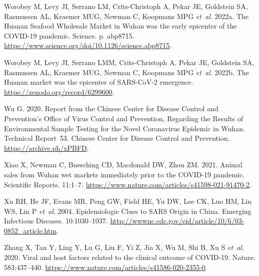 \documentclass[11pt]{article}
\begin{document}
\begin{thebibliography}{24}
{Worobey M, Levy JI, Serrano LM, {Crits-Christoph} A, Pekar JE, Goldstein SA,
  Rasmussen AL, Kraemer MUG, Newman C, Koopmans MPG {\em et~al\/}}. 2022{a}.
  The {{Huanan Seafood Wholesale Market}} in {{Wuhan}} was the early epicenter
  of the {{COVID-19}} pandemic. Science. p. abp8715.
  \url{https://www.science.org/doi/10.1126/science.abp8715}.

{Worobey M, Levy JI, Serrano LMM, {Crits-Christoph} A, Pekar JE, Goldstein SA,
  Rasmussen AL, Kraemer MUG, Newman C, Koopmans MPG {\em et~al\/}}. 2022{b}.
  The {{Huanan}} market was the epicenter of {{SARS-CoV-2}} emergence.
  \url{https://zenodo.org/record/6299600}.

{Wu G}. 2020. {Report from the Chinese Center for Disease Control and
  Prevention's Office of Virus Control and Prevention, Regarding the Results of
  Environmental Sample Testing for the Novel Coronavirus Epidemic in Wuhan}.
  Technical Report~53. Chinese Center for Disease Control and Prevention.
  \url{https://archive.ph/xPBFD}.

{Xiao X, Newman C, Buesching CD, Macdonald DW, Zhou ZM}. 2021. Animal sales
  from {{Wuhan}} wet markets immediately prior to the {{COVID-19}} pandemic.
  Scientific Reports. 11:1--7.
  \url{https://www.nature.com/articles/s41598-021-91470-2}.

{Xu RH, He JF, Evans MR, Peng GW, Field HE, Yu DW, Lee CK, Luo HM, Lin WS, Lin
  P {\em et~al\/}}. 2004. Epidemiologic {{Clues}} to {{SARS Origin}} in
  {{China}}. Emerging Infectious Diseases. 10:1030--1037.
  \url{http://wwwnc.cdc.gov/eid/article/10/6/03-0852_article.htm}.

{Zhang X, Tan Y, Ling Y, Lu G, Liu F, Yi Z, Jia X, Wu M, Shi B, Xu S {\em
  et~al\/}}. 2020. Viral and host factors related to the clinical outcome of
  {{COVID-19}}. Nature. 583:437--440.
  \url{https://www.nature.com/articles/s41586-020-2355-0}.

\end{thebibliography}
\end{document}
